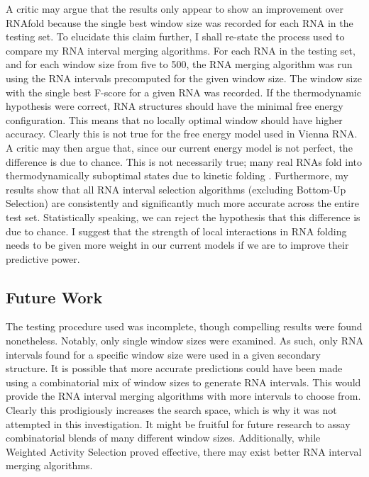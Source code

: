 \documentclass{cshonours}
\begin{document}
A critic may argue that the results only appear to show an improvement over RNAfold because the single best window size was recorded for each RNA in the testing set. To elucidate this claim further, I shall re-state the process used to compare my RNA interval merging algorithms. For each RNA in the testing set, and for each window size from five to 500, the RNA merging algorithm was run using the RNA intervals precomputed for the given window size. The window size with the single best F-score for a given RNA was recorded. If the thermodynamic hypothesis were correct, RNA structures should have the minimal free energy configuration. This means that no locally optimal window should have higher accuracy. Clearly this is not true for the free energy model used in Vienna RNA. A critic may then argue that, since our current energy model is not perfect, the difference is due to chance. This is not necessarily true; many real RNAs fold into thermodynamically suboptimal states due to kinetic folding \cite{ditzler2008rugged, treiber2001beyond}. Furthermore, my results show that all RNA interval selection algorithms (excluding Bottom-Up Selection) are consistently and significantly much more accurate across the entire test set. Statistically speaking, we can reject the hypothesis that this difference is due to chance. I suggest that the strength of local interactions in RNA folding needs to be given more weight in our current models if we are to improve their predictive power.

\subsection{Future Work}

The testing procedure used was incomplete, though compelling results were found nonetheless. Notably, only single window sizes were examined. As such, only RNA intervals found for a specific window size were used in a given secondary structure. It is possible that more accurate predictions could have been made using a combinatorial mix of window sizes to generate RNA intervals. This would provide the RNA interval merging algorithms with more intervals to choose from. Clearly this prodigiously increases the search space, which is why it was not attempted in this investigation. It might be fruitful for future research to assay combinatorial blends of many different window sizes. Additionally, while Weighted Activity Selection proved effective, there may exist better RNA interval merging algorithms.
\end{document}
